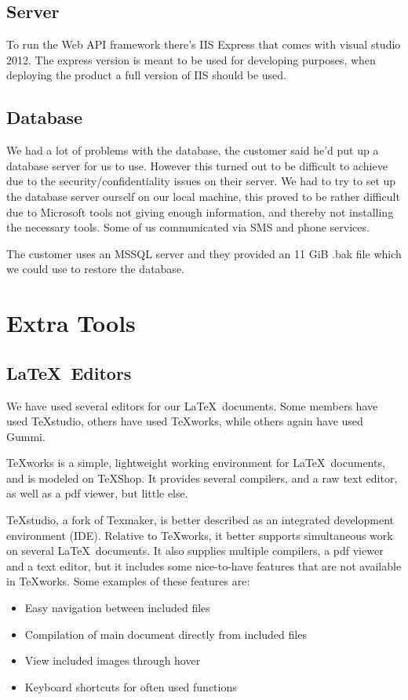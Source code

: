 \subsection{Server}
To run the Web API framework there's IIS Express that comes with visual studio 2012. The express version is meant to be used for developing purposes, when deploying the product a full version of IIS should be used.

\subsection{Database}
We had a lot of problems with the database, the customer said he'd put up a database server for us to use. However this turned out to be difficult to achieve due to the security/confidentiality issues on their server. We had to try to set up the database server ourself on our local machine, this proved to be rather difficult due to Microsoft tools not giving enough information, and thereby not installing the necessary tools. Some of us communicated via SMS and phone services.

The customer uses an MSSQL server and they provided an 11 GiB .bak file which we could use to restore the database.

\section{Extra Tools}
\subsection{\LaTeX \ Editors}%
We have used several editors for our \LaTeX \ documents. Some members have used TeXstudio, others have used TeXworks, while others again have used Gummi.

TeXworks is a simple, lightweight working environment for \LaTeX \ documents, and is modeled on TeXShop. It provides several compilers, and a raw text editor, as well as a pdf viewer, but little else.

TeXstudio, a fork of Texmaker, is better described as an integrated development environment (IDE). Relative to TeXworks, it better supports simultaneous work on several \LaTeX \ documents. It also supplies multiple compilers, a pdf viewer and a text editor, but it includes some nice-to-have features that are not available in TeXworks. Some examples of these features are:
\begin{itemize}
\item Easy navigation between included files
\item Compilation of main document directly from included files
\item View included images through hover
\item Keyboard shortcuts for often used functions
\end{itemize}

